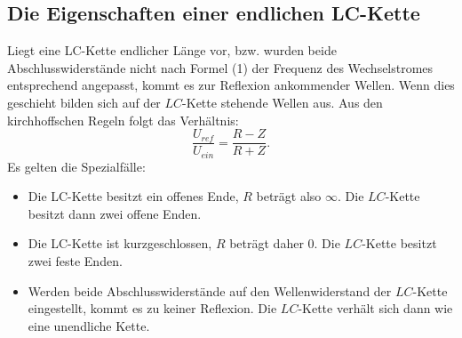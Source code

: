 \subsection{Die Eigenschaften einer endlichen LC-Kette}
Liegt eine LC-Kette endlicher Länge vor, bzw. wurden beide Abschlusswiderstände
 nicht nach Formel (1) der Frequenz des Wechselstromes entsprechend angepasst,
  kommt es zur Reflexion ankommender Wellen. Wenn dies geschieht bilden sich auf der
   $LC$-Kette stehende Wellen aus. Aus den kirchhoffschen Regeln folgt das Verhältnis:
  \begin{equation}
    \frac{U_{ref}}{U_{ein}} = \frac{R-Z}{R+Z}\text{.}
  \end{equation}
  Es gelten die Spezialfälle:\\
\begin{itemize}
  \item Die LC-Kette besitzt ein offenes Ende, $R$ beträgt also $\infty$. Die $LC$-Kette
   besitzt dann zwei offene Enden.\\

  \item Die LC-Kette ist kurzgeschlossen, $R$ beträgt daher 0. Die $LC$-Kette besitzt zwei
  feste Enden.\\

 \item Werden beide Abschlusswiderstände auf den Wellenwiderstand der $LC$-Kette eingestellt,
  kommt es zu keiner Reflexion. Die $LC$-Kette verhält sich dann wie eine unendliche Kette.
\end{itemize}
